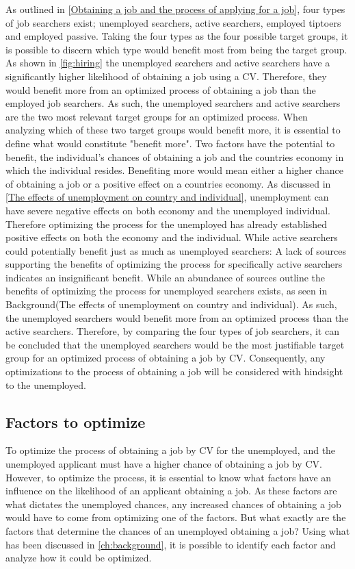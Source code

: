 As outlined in \ref{Obtaining a job and the process of applying for a job}, four types of job searchers exist; unemployed searchers, active searchers, employed tiptoers and employed passive.
Taking the four types as the four possible target groups, it is possible to discern which type would benefit most from being the target group.
As shown in \ref{fig:hiring} the unemployed searchers and active searchers have a significantly higher likelihood of obtaining a job using a CV.
Therefore, they would benefit more from an optimized process of obtaining a job than the employed job searchers.
As such, the unemployed searchers and active searchers are the two most relevant target groups for an optimized process.
When analyzing which of these two target groups would benefit more, it is essential to define what would constitute "benefit more".
Two factors have the potential to benefit, the individual's chances of obtaining a job and the countries economy in which the individual resides.
Benefiting more would mean either a higher chance of obtaining a job or a positive effect on a countries economy.
As discussed in \ref{The effects of unemployment on country and individual}, unemployment can have severe negative effects on both economy and the unemployed individual.
Therefore optimizing the process for the unemployed has already established positive effects on both the economy and the individual.
While active searchers could potentially benefit just as much as unemployed searchers:
A lack of sources supporting the benefits of optimizing the process for specifically active searchers indicates an insignificant benefit.
While an abundance of sources outline the benefits of optimizing the process for unemployed searchers exists, as seen in Background(The effects of unemployment on country and individual).
As such, the unemployed searchers would benefit more from an optimized process than the active searchers.
Therefore, by comparing the four types of job searchers, it can be concluded that the unemployed searchers would be the most justifiable target group for an optimized process of obtaining a job by CV.
Consequently, any optimizations to the process of obtaining a job will be considered with hindsight to the unemployed. \\
 
\subsection{Factors to optimize}
To optimize the process of obtaining a job by CV for the unemployed, and the unemployed applicant must have a higher chance of obtaining a job by CV.
However, to optimize the process, it is essential to know what factors have an influence on the likelihood of an applicant obtaining a job.
As these factors are what dictates the unemployed chances, any increased chances of obtaining a job would have to come from optimizing one of the factors.
But what exactly are the factors that determine the chances of an unemployed obtaining a job?
Using what has been discussed in \ref{ch:background}, it is possible to identify each factor and analyze how it could be optimized. \\

